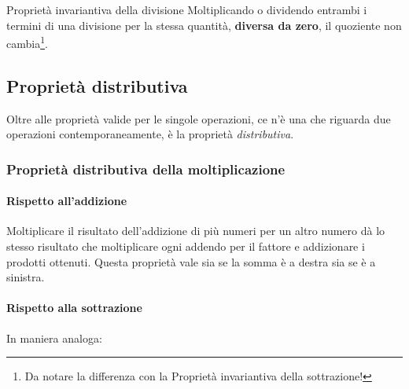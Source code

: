 \begin{definizione}{Proprietà invariantiva della divisione}{}
Moltiplicando o dividendo entrambi i termini di una divisione per 
la stessa quantità, \textbf{diversa da zero}, 
il quoziente non cambia\footnote{
Da notare la differenza con la Proprietà invariantiva della sottrazione!}.
\end{definizione}

\subsection{Proprietà distributiva}

Oltre alle proprietà valide per le singole operazioni, ce n'è una che 
riguarda due operazioni contemporaneamente, è la proprietà 
\emph{distributiva}.

\subsubsection{Proprietà distributiva della moltiplicazione}

\paragraph{Rispetto all'addizione}
Moltiplicare il risultato dell'addizione di più numeri per un altro numero 
dà lo stesso risultato che moltiplicare ogni addendo per il fattore e 
addizionare i prodotti ottenuti. Questa proprietà vale sia se la somma è a 
destra sia se è a sinistra.


\vspace{.5em}

\paragraph{Rispetto alla sottrazione}
In maniera analoga:


